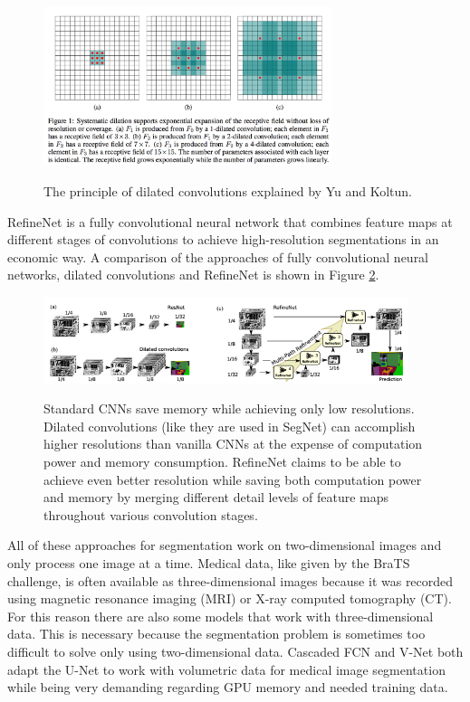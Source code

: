 \documentclass[a4paper,12pt,pagesize,headsepline,bibtotoc,titlepage]{scrartcl}
\begin{document}
\begin{figure}[!htb]
\begin{center}
\includegraphics*[width=0.75\textwidth]{images/dilated_convolution.png}\\
\caption{The principle of dilated convolutions explained by Yu and Koltun\cite{DilatedNet2015}.}
\label{fig:dilated_conv}
\end{center}
\end{figure}


RefineNet \cite{RefineNet2016} is a fully convolutional neural network that combines feature maps at different stages of convolutions to achieve high-resolution segmentations in an economic way.
A comparison of the approaches of fully convolutional neural networks, dilated convolutions and RefineNet is shown in Figure \ref{fig:refinenet}.

\begin{figure}[!htb]
\begin{center}
\includegraphics*[width=0.95\textwidth]{images/refinenet.png}\\
\caption{Standard CNNs save memory while achieving only low resolutions. Dilated convolutions (like they are used in SegNet) can accomplish higher resolutions than vanilla CNNs at the expense of computation power and memory consumption. RefineNet claims to be able to achieve even better resolution while saving both computation power and memory by merging different detail levels of feature maps throughout various convolution stages.}
\label{fig:refinenet}
\end{center}
\end{figure}

All of these approaches for segmentation work on two-dimensional images and only process one image at a time.
Medical data, like given by the BraTS challenge, is often available as three-dimensional images because it was recorded using magnetic resonance imaging (MRI) or X-ray computed tomography (CT).
For this reason there are also some models that work with three-dimensional data.
This is necessary because the segmentation problem is sometimes too difficult to solve only using two-dimensional data.
Cascaded FCN\cite{CascadedFCN} and V-Net\cite{VNET} both adapt the U-Net to work with volumetric data for medical image segmentation while being very demanding regarding GPU memory and needed training data.
\end{document}
